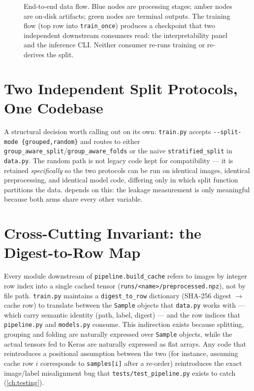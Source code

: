 \documentclass[11pt,a4paper,oneside]{report}
\newcommand{\code}[1]{\texttt{\small #1}}
\begin{document}
\begin{figure}[htbp]
{%
}
\caption{End-to-end data flow. Blue nodes are processing stages; amber nodes
are on-disk artifacts; green nodes are terminal outputs. The training flow
(top row into \code{train\_once}) produces a checkpoint that two independent
downstream consumers read: the interpretability panel and the inference
CLI. Neither consumer re-runs training or re-derives the split.}
\label{fig:architecture}
\end{figure}

\section{Two Independent Split Protocols, One Codebase}

A structural decision worth calling out on its own: \code{train.py} accepts
\code{-{}-split-mode \{grouped,random\}} and routes to either
\code{group\_aware\_split}/\code{group\_aware\_folds} or the naive
\code{stratified\_split} in \code{data.py}. The random path is not legacy
code kept for compatibility --- it is retained \emph{specifically} so the two
protocols can be run on identical images, identical preprocessing, and
identical model code, differing only in which split function partitions the
data.  depends on this: the leakage measurement is only
meaningful because both arms share every other variable.

\section{Cross-Cutting Invariant: the Digest-to-Row Map}

Every module downstream of \code{pipeline.build\_cache} refers to images by
integer row index into a single cached tensor
(\texttt{runs/<name>/preprocessed.npz}), not by file path. \code{train.py}
maintains a \code{digest\_to\_row} dictionary (SHA-256 digest
$\rightarrow$ cache row) to translate between the \code{Sample} objects that
\code{data.py} works with --- which carry semantic identity (path, label,
digest) --- and the row indices that \code{pipeline.py} and \code{models.py}
consume. This indirection exists because splitting, grouping and folding are
naturally expressed over \code{Sample} objects, while the actual tensors fed
to Keras are naturally expressed as flat arrays. Any code that reintroduces a
positional assumption between the two (for instance, assuming cache row $i$
corresponds to \code{samples[i]} after a re-order) reintroduces the exact
image/label misalignment bug that \texttt{tests/test\_pipeline.py} exists to
catch (\cref{ch:testing}).
\end{document}
